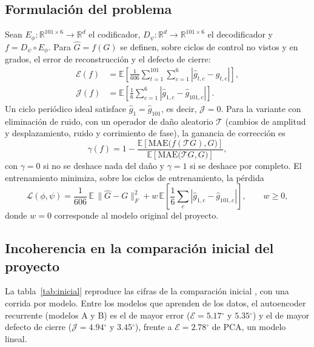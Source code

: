 \documentclass[11pt,a4paper]{article}
\newcommand{\gr}{$^{\circ}$}
\newcommand{\Mae}{\mathrm{MAE}}
\newcommand{\R}{\mathbb{R}}
\newcommand{\E}{\mathbb{E}}
\begin{document}
\subsection{Formulación del problema}

Sean $E_\phi:\R^{101\times 6}\to\R^d$ el codificador, $D_\psi:\R^d\to\R^{101\times 6}$ el decodificador y $f=D_\psi\circ E_\phi$. Para $\hat G=f(G)$ se definen, sobre ciclos de control no vistos y en grados, el error de reconstrucción y el defecto de cierre:
\begin{align}
\mathcal E(f)&=\E\!\left[\frac{1}{606}\sum_{t=1}^{101}\sum_{c=1}^{6}\left|\hat g_{t,c}-g_{t,c}\right|\right],\\
\mathcal J(f)&=\E\!\left[\frac{1}{6}\sum_{c=1}^{6}\left|\hat g_{1,c}-\hat g_{101,c}\right|\right].
\end{align}
Un ciclo periódico ideal satisface $\hat g_1=\hat g_{101}$, es decir, $\mathcal J=0$. Para la variante con eliminación de ruido, con un operador de daño aleatorio $\mathcal T$ (cambios de amplitud y desplazamiento, ruido y corrimiento de fase), la ganancia de corrección es
\begin{equation}
\gamma(f)=1-\frac{\E\left[\Mae\big(f(\mathcal T G),G\big)\right]}{\E\left[\Mae\big(\mathcal T G,G\big)\right]},
\end{equation}
con $\gamma=0$ si no se deshace nada del daño y $\gamma=1$ si se deshace por completo. El entrenamiento minimiza, sobre los ciclos de entrenamiento, la pérdida
\begin{equation}
\mathcal L(\phi,\psi)=\frac{1}{606}\,\E\,\|\hat G-G\|_F^2+w\,\E\!\left[\frac16\sum_{c}\left|\hat g_{1,c}-\hat g_{101,c}\right|\right],\qquad w\ge 0,
\label{eq:perdida}
\end{equation}
donde $w=0$ corresponde al modelo original del proyecto.

\subsection{Incoherencia en la comparación inicial del proyecto}

La tabla~\ref{tab:inicial} reproduce las cifras de la comparación inicial \cite{neurostride2026}, con una corrida por modelo. Entre los modelos que aprenden de los datos, el autoencoder recurrente (modelos A y B) es el de mayor error ($\mathcal E=5.17$\gr{} y $5.35$\gr) y el de mayor defecto de cierre ($\mathcal J=4.94$\gr{} y $3.45$\gr), frente a $\mathcal E=2.78$\gr{} de PCA, un modelo lineal.
\end{document}
